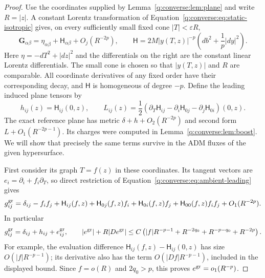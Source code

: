 \begin{proof}
Use the coordinates supplied by Lemma~\ref{q:converse:lem:plane} and
write $R=|z|$.  A constant Lorentz transformation of
Equation~\eqref{q:converse:eq:static-isotropic} gives, on every sufficiently
small fixed cone $|T|<\varepsilon R$,
\begin{equation}
 \mathbf G_{\alpha\beta}
 =\eta_{\alpha\beta}+\mathsf H_{\alpha\beta}
       +O_j(R^{-2p}),\qquad
 \mathsf H=2M|y(T,z)|^{-p}
       \left(db^2+\frac1p|dy|^2\right).
 \label{q:converse:eq:ambient-leading}
\end{equation}
Here $\eta=-dT^2+|dz|^2$ and the differentials on the right are the
constant linear Lorentz differentials.  The small cone is chosen so
that $|y(T,z)|$ and $R$ are comparable.  All coordinate derivatives of
any fixed order have their corresponding decay, and
$\mathsf H$ is homogeneous of degree $-p$.
Define the leading induced plane tensors by
\begin{equation}
 h_{ij}(z)=\mathsf H_{ij}(0,z),\qquad
 L_{ij}(z)=\frac12\left(
 \partial_T\mathsf H_{ij}
 -\partial_i\mathsf H_{0j}-\partial_j\mathsf H_{0i}
 \right)(0,z).
 \label{q:converse:eq:plane-tensors}
\end{equation}
The exact reference plane has metric
$\delta+h+O_2(R^{-2p})$ and second form
$L+O_1(R^{-2p-1})$.  Its charges were computed in
Lemma~\ref{q:converse:lem:boost}.  We will show that precisely the same
terms survive in the ADM fluxes of the given hypersurface.

First consider its graph $T=f(z)$ in these coordinates.
Its tangent vectors are $e_i=\partial_i+f_i\partial_T$, so direct
restriction of Equation~\eqref{q:converse:eq:ambient-leading} gives
\[
 g^{\rm gr}_{ij}
 =\delta_{ij}-f_if_j+\mathsf H_{ij}(f,z)
  +\mathsf H_{0j}(f,z)f_i+\mathsf H_{0i}(f,z)f_j
  +\mathsf H_{00}(f,z)f_if_j+O_1(R^{-2p}).
\]
In particular
\begin{equation}
 g^{\rm gr}_{ij}=\delta_{ij}+h_{ij}+e^{\rm gr}_{ij},
 \qquad
 |e^{\rm gr}|+R|De^{\rm gr}|
 \le C\left(
 |f|R^{-p-1}+R^{-2q_0}+R^{-p-q_0}+R^{-2p}
 \right).
 \label{q:converse:eq:graph-metric-error}
\end{equation}
For example, the evaluation difference
$\mathsf H_{ij}(f,z)-\mathsf H_{ij}(0,z)$ has size
$O(|f|R^{-p-1})$; its derivative also has the term
$O(|Df|R^{-p-1})$, included in the displayed bound.
Since $f=o(R)$ and $2q_0>p$, this proves
$e^{\rm gr}=o_1(R^{-p})$.


\end{proof}

